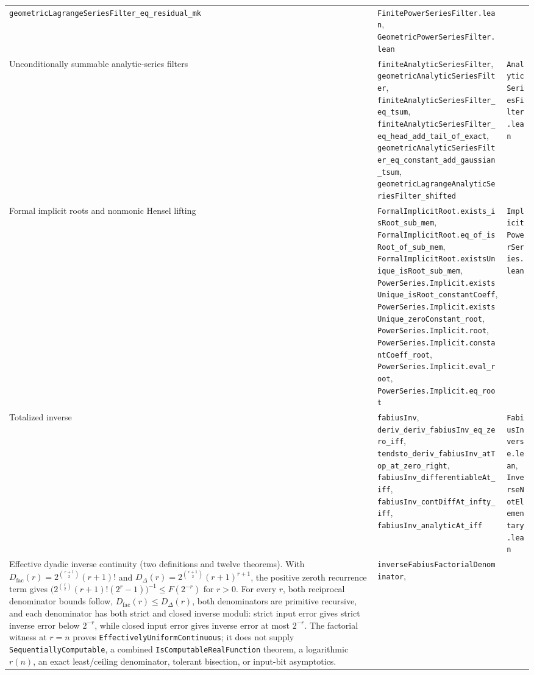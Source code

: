 \documentclass[11pt,oneside]{article}
\theoremstyle{definition}
\theoremstyle{remark}
\begin{document}
\begin{longtable}{@{}p{}p{}p{}@{}}
\nolinkurl{geometricLagrangeSeriesFilter_eq_residual_mk} &
\nolinkurl{FinitePowerSeriesFilter.lean},
\nolinkurl{GeometricPowerSeriesFilter.lean} \\
Unconditionally summable analytic-series filters &
\nolinkurl{finiteAnalyticSeriesFilter},
\nolinkurl{geometricAnalyticSeriesFilter},
\nolinkurl{finiteAnalyticSeriesFilter_eq_tsum},
\nolinkurl{finiteAnalyticSeriesFilter_eq_head_add_tail_of_exact},
\nolinkurl{geometricAnalyticSeriesFilter_eq_constant_add_gaussian_tsum},
\nolinkurl{geometricLagrangeAnalyticSeriesFilter_shifted} &
\nolinkurl{AnalyticSeriesFilter.lean} \\
Formal implicit roots and nonmonic Hensel lifting &
\nolinkurl{FormalImplicitRoot.exists_isRoot_sub_mem},
\nolinkurl{FormalImplicitRoot.eq_of_isRoot_of_sub_mem},
\nolinkurl{FormalImplicitRoot.existsUnique_isRoot_sub_mem},
\nolinkurl{PowerSeries.Implicit.existsUnique_isRoot_constantCoeff},
\nolinkurl{PowerSeries.Implicit.existsUnique_zeroConstant_root},
\nolinkurl{PowerSeries.Implicit.root},
\nolinkurl{PowerSeries.Implicit.constantCoeff_root},
\nolinkurl{PowerSeries.Implicit.eval_root},
\nolinkurl{PowerSeries.Implicit.eq_root} &
\nolinkurl{ImplicitPowerSeries.lean} \\
Totalized inverse & \nolinkurl{fabiusInv}, \nolinkurl{deriv_deriv_fabiusInv_eq_zero_iff}, \nolinkurl{tendsto_deriv_fabiusInv_atTop_at_zero_right}, \nolinkurl{fabiusInv_differentiableAt_iff}, \nolinkurl{fabiusInv_contDiffAt_infty_iff}, \nolinkurl{fabiusInv_analyticAt_iff} & \nolinkurl{FabiusInverse.lean}, \nolinkurl{InverseNotElementary.lean} \\
Effective dyadic inverse continuity (two definitions and twelve theorems).
With
\(D_{\mathrm{fac}}(r)=2^{\binom{r+1}{2}}(r+1)!\) and
\(D_{\Delta}(r)=2^{\binom{r+1}{2}}(r+1)^{r+1}\), the positive zeroth
recurrence term gives
\(\bigl(2^{\binom r2}(r+1)!(2^r-1)\bigr)^{-1}\le F(2^{-r})\) for \(r>0\).
For every \(r\), both reciprocal denominator bounds follow,
\(D_{\mathrm{fac}}(r)\le D_{\Delta}(r)\), both denominators are primitive
recursive, and each denominator has both strict and closed inverse moduli:
strict input error gives strict inverse error below \(2^{-r}\), while closed
input error gives inverse error at most \(2^{-r}\).  The factorial witness at \(r=n\) proves
\nolinkurl{EffectivelyUniformContinuous}; it does not supply
\nolinkurl{SequentiallyComputable}, a combined
\nolinkurl{IsComputableRealFunction} theorem, a logarithmic \(r(n)\), an exact
least/ceiling denominator, tolerant bisection, or input-bit asymptotics. &
\nolinkurl{inverseFabiusFactorialDenominator},

\end{longtable}
\end{document}
